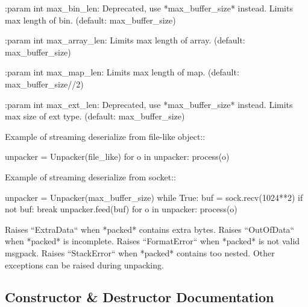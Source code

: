 \begin{DoxyVerb}
:param int max_bin_len:
    Deprecated, use *max_buffer_size* instead.
    Limits max length of bin. (default: max_buffer_size)

:param int max_array_len:
    Limits max length of array.
    (default: max_buffer_size)

:param int max_map_len:
    Limits max length of map.
    (default: max_buffer_size//2)

:param int max_ext_len:
    Deprecated, use *max_buffer_size* instead.
    Limits max size of ext type.  (default: max_buffer_size)

Example of streaming deserialize from file-like object::

    unpacker = Unpacker(file_like)
    for o in unpacker:
        process(o)

Example of streaming deserialize from socket::

    unpacker = Unpacker(max_buffer_size)
    while True:
        buf = sock.recv(1024**2)
        if not buf:
            break
        unpacker.feed(buf)
        for o in unpacker:
            process(o)

Raises ``ExtraData`` when *packed* contains extra bytes.
Raises ``OutOfData`` when *packed* is incomplete.
Raises ``FormatError`` when *packed* is not valid msgpack.
Raises ``StackError`` when *packed* contains too nested.
Other exceptions can be raised during unpacking.
\end{DoxyVerb}
 

\subsection{Constructor \& Destructor Documentation}
\mbox{\label{classpip_1_1__vendor_1_1msgpack_1_1fallback_1_1Unpacker_ad4296e668817d2f33b8999edfbf6f47d}} 
